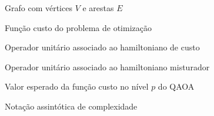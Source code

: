 \begin{simbolos}
  \item[$G=(V,E)$] Grafo com vértices $V$ e arestas $E$
  \item[$C(z)$] Função custo do problema de otimização

  \item[$U(C,\gamma)$] Operador unitário associado ao hamiltoniano de custo
  \item[$U(B,\beta)$] Operador unitário associado ao hamiltoniano misturador
  \item[$F_p(\boldsymbol{\gamma},\boldsymbol{\beta})$] Valor esperado da função custo no nível $p$ do QAOA

  \item[$O(\cdot)$] Notação assintótica de complexidade

\end{simbolos}

\tableofcontents*
\cleardoublepage
